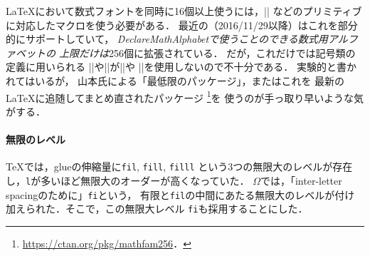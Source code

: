 \documentclass[a4paper,11pt,nomag,dvipdfmx]{jsarticle}
\newcommand{\OMEGA}{\texorpdfstring{$\Omega$}{Ω}}
\begin{document}
\medskip
\LaTeX において数式フォントを同時に16個以上使うには，|\omathchar|%
などのプリミティブに対応したマクロを使う必要がある．
最近の\pLaTeX（2016/11/29以降）はこれを部分的にサポートしていて，
\emph{\.{DeclareMathAlphabet}で使うことのできる数式用アルファベットの
上限だけは}256個に拡張されている．
だが，これだけでは記号類の定義に用いられる
|\DeclareMathSymbol|や|\DeclareMathDelimiter|が|\omathchar|や
|\odelcode|を使用しないので不十分である．
実験的と書かれてはいるが，
山本氏による「最低限のパッケージ」\cite{yamamoto3}，またはこれを
最新の\LaTeX に追随してまとめ直されたパッケージ
\footnote{\url{https://ctan.org/pkg/mathfam256}．}を
使うのが手っ取り早いような気がする．

\paragraph{無限のレベル}
\TeX では，glueの伸縮量に\texttt{fil}, \texttt{fill}, \texttt{filll}
という3つの無限大のレベルが存在し，\texttt{l}が多いほど無限大のオーダーが高くなっていた．
\OMEGA では，「inter-letter spacingのために」\texttt{fi}という，
有限と\texttt{fil}の中間にあたる無限大のレベルが付け加えられた．そこで，この無限大レベル
\texttt{fi}も採用することにした．

\medskip
\end{document}
